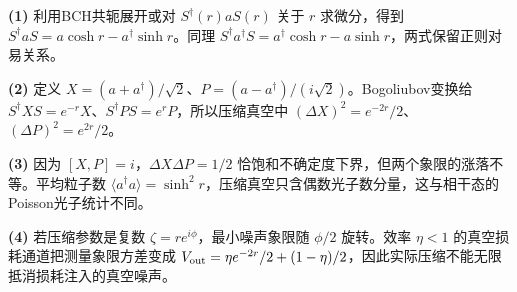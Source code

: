 \par\noindent\textbf{(1)} 利用BCH共轭展开或对 \(S^\dagger(r)aS(r)\) 关于 \(r\) 求微分，得到 \(S^\dagger aS=a\cosh r-a^\dagger\sinh r\)。同理 \(S^\dagger a^\dagger S=a^\dagger\cosh r-a\sinh r\)，两式保留正则对易关系。
\par\noindent\textbf{(2)} 定义 \(X=(a+a^\dagger)/\sqrt2\)、\(P=(a-a^\dagger)/(i\sqrt2)\)。Bogoliubov变换给 \(S^\dagger XS=e^{-r}X\)、\(S^\dagger PS=e^{r}P\)，所以压缩真空中 \((\Delta X)^2=e^{-2r}/2\)、\((\Delta P)^2=e^{2r}/2\)。
\par\noindent\textbf{(3)} 因为 \([X,P]=i\)，\(\Delta X\Delta P=1/2\) 恰饱和不确定度下界，但两个象限的涨落不等。平均粒子数 \(\langle a^\dagger a\rangle=\sinh^2r\)，压缩真空只含偶数光子数分量，这与相干态的Poisson光子统计不同。
\par\noindent\textbf{(4)} 若压缩参数是复数 \(\zeta=re^{i\phi}\)，最小噪声象限随 \(\phi/2\) 旋转。效率 \(\eta<1\) 的真空损耗通道把测量象限方差变成 \(V_{\rm out}=\eta e^{-2r}/2+(1-\eta)/2\)，因此实际压缩不能无限抵消损耗注入的真空噪声。
